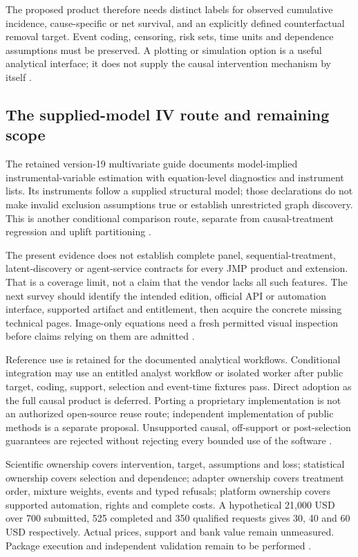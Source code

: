 The proposed product therefore needs distinct labels for observed
cumulative incidence, cause-specific or net survival, and an explicitly
defined counterfactual removal target. Event coding, censoring, risk sets,
time units and dependence assumptions must be preserved. A plotting or
simulation option is a useful analytical interface; it does not supply the
causal intervention mechanism by itself
\citep{exec14_survival_jmp,exec24_jmp_choice}.

\subsection{The supplied-model IV route and remaining scope}
The retained version-19 multivariate guide documents model-implied
instrumental-variable estimation with equation-level diagnostics and
instrument lists. Its instruments follow a supplied structural model;
those declarations do not make invalid exclusion assumptions true or
establish unrestricted graph discovery. This is another conditional
comparison route, separate from causal-treatment regression and uplift
partitioning \citep{exec13_ivrd_jmp}.

The present evidence does not establish complete panel, sequential-treatment,
latent-discovery or agent-service contracts for every JMP product and
extension. That is a coverage limit, not a claim that the vendor lacks all
such features. The next survey should identify the intended edition,
official API or automation interface, supported artifact and entitlement,
then acquire the concrete missing technical pages. Image-only equations
need a fresh permitted visual inspection before claims relying on them
are admitted \citep{exec24_jmp_choice}.

Reference use is retained for the documented analytical workflows.
Conditional integration may use an entitled analyst workflow or isolated
worker after public target, coding, support, selection and event-time
fixtures pass. Direct adoption as the full causal product is deferred.
Porting a proprietary implementation is not an authorized open-source
reuse route; independent implementation of public methods is a separate
proposal. Unsupported causal, off-support or post-selection guarantees
are rejected without rejecting every bounded use of the software
\citep{exec24_jmp_choice}.

Scientific ownership covers intervention, target, assumptions and loss;
statistical ownership covers selection and dependence; adapter ownership
covers treatment order, mixture weights, events and typed refusals; platform
ownership covers supported automation, rights and complete costs. A
hypothetical 21,000 USD over 700 submitted, 525 completed and 350
qualified requests gives 30, 40 and 60 USD respectively. Actual prices,
support and bank value remain unmeasured. Package execution and independent validation remain to be performed
\citep{exec24_jmp_choice}.


